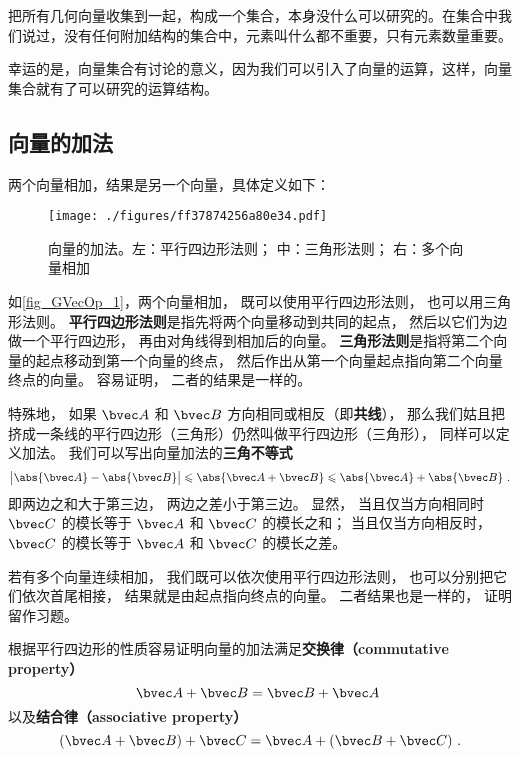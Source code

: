 

把所有几何向量收集到一起，构成一个集合，本身没什么可以研究的。在集合中我们说过，没有任何附加结构的集合中，元素叫什么都不重要，只有元素数量重要。

幸运的是，向量集合有讨论的意义，因为我们可以引入了向量的运算，这样，向量集合就有了可以研究的运算结构。

\subsection{向量的加法}
两个向量相加，结果是另一个向量，具体定义如下：
\begin{figure}[ht]
\centering
\texttt{[image: ./figures/ff37874256a80e34.pdf]}
\caption{向量的加法。左：平行四边形法则； 中：三角形法则； 右：多个向量相加} \label{fig_GVecOp_1}
\end{figure}
如\autoref{fig_GVecOp_1}，两个向量相加， 既可以使用平行四边形法则， 也可以用三角形法则。 \textbf{平行四边形法则}是指先将两个向量移动到共同的起点， 然后以它们为边做一个平行四边形， 再由对角线得到相加后的向量。 \textbf{三角形法则}是指将第二个向量的起点移动到第一个向量的终点， 然后作出从第一个向量起点指向第二个向量终点的向量。 容易证明， 二者的结果是一样的。

特殊地， 如果 $\bvec A$ 和 $\bvec B$ 方向相同或相反（即\textbf{共线}）， 那么我们姑且把挤成一条线的平行四边形（三角形）仍然叫做平行四边形（三角形）， 同样可以定义加法。 我们可以写出向量加法的\textbf{三角不等式}
\begin{equation}
\big|\abs{\bvec A} - \abs{\bvec B}\big| \leqslant \abs{\bvec A + \bvec B} \leqslant \abs{\bvec A} + \abs{\bvec B}~.
\end{equation}
即两边之和大于第三边， 两边之差小于第三边。 显然， 当且仅当方向相同时 $\bvec C$ 的模长等于 $\bvec A$ 和 $\bvec C$ 的模长之和； 当且仅当方向相反时， $\bvec C$ 的模长等于 $\bvec A$ 和 $\bvec C$ 的模长之差。 

若有多个向量连续相加， 我们既可以依次使用平行四边形法则， 也可以分别把它们依次首尾相接， 结果就是由起点指向终点的向量。 二者结果也是一样的， 证明留作习题。

根据平行四边形的性质容易证明向量的加法满足\textbf{交换律（commutative property）}
\begin{equation}
\bvec A + \bvec B = \bvec B + \bvec A~
\end{equation}
以及\textbf{结合律（associative property）}
\begin{equation}
(\bvec A + \bvec B) + \bvec C = \bvec A + (\bvec B + \bvec C)~.
\end{equation}

